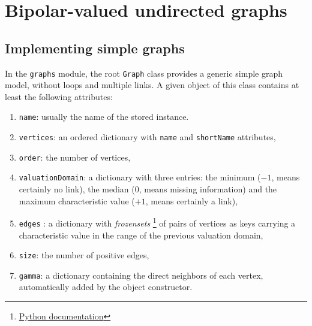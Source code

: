 \chapter{Bipolar-valued undirected graphs}
\label{sec:21}



\section{Implementing simple graphs}
\label{sec:21.1}

In the \Digraph \texttt{graphs} module, the root \texttt{Graph} class  provides a generic simple graph model, without loops and multiple links. A given object of this class contains at least the following attributes:
\begin{enumerate}[topsep=1pt]
\item \texttt{name}: usually the name of the stored instance.
\item \texttt{vertices}: an ordered dictionary with \texttt{name} and \texttt{shortName} attributes,
\item \texttt{order}: the number of vertices,
\item \texttt{valuationDomain}: a dictionary with three entries: the minimum ($-1$, means certainly no link), the median ($0$, means missing information) and the maximum characteristic value ($+1$, means certainly a link),
\item \texttt{edges} : a dictionary with \emph{frozensets} \footnote{\href{https://docs.python.org/3.9/library/stdtypes.html?highlight=frozenset\#frozenset}{Python documentation}} of pairs of vertices as keys carrying a characteristic value in the range of the previous valuation domain,
\item \texttt{size}: the number of positive edges,
\item \texttt{gamma}: a dictionary containing the direct neighbors of each vertex, automatically added by the object constructor.
\end{enumerate}


